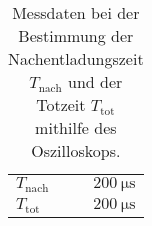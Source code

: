 \begin{table}[!h]
\begin{center}
\begin{tabular}{|l|r|}
\hline
$T_\mathrm{nach}$ & $\SI{200}{\micro\second}$ \\
$T_\mathrm{tot}$ & $\SI{200}{\micro\second}$\\
\hline
\end{tabular}
\caption[Aufbabe b,c]{Messdaten bei der Bestimmung der Nachentladungszeit $T_\mathrm{nach}$ und der Totzeit $T_\mathrm{tot}$ mithilfe des Oszilloskops.}
\label{tabelleb}
\end{center}
\end{table}